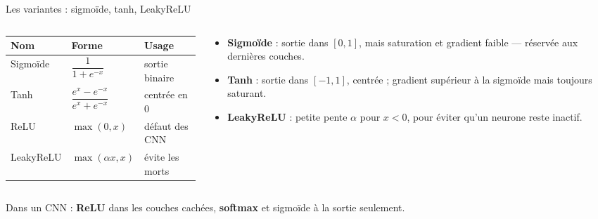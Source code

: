 \begin{frame}{Les variantes : sigmoïde, tanh, LeakyReLU}
\begin{columns}[t]
\begin{column}{0.52\textwidth}
\begin{center}
\begin{tabular}{@{}lll@{}}
\toprule
\textbf{Nom} & \textbf{Forme} & \textbf{Usage} \\
\midrule
Sigmoïde & $\dfrac{1}{1+e^{-x}}$ & sortie binaire \\
Tanh & $\dfrac{e^{x}-e^{-x}}{e^{x}+e^{-x}}$ & centrée en $0$ \\
ReLU & $\max(0,x)$ & défaut des CNN \\
LeakyReLU & $\max(\alpha x,x)$ & évite les morts \\
\bottomrule
\end{tabular}
\end{center}
\end{column}
\begin{column}{0.44\textwidth}
\begin{itemize}
  \item \textbf{Sigmoïde} : sortie dans $[0,1]$, mais saturation et gradient
  faible --- réservée aux dernières couches.
  \item \textbf{Tanh} : sortie dans $[-1,1]$, centrée ; gradient supérieur à
  la sigmoïde mais toujours saturant.
  \item \textbf{LeakyReLU} : petite pente $\alpha$ pour $x<0$, pour éviter
  qu'un neurone reste inactif.
\end{itemize}
\end{column}
\end{columns}
\vspace{1mm}
\begin{kbox}
Dans un CNN : \textbf{ReLU} dans les couches cachées, \textbf{softmax} et
sigmoïde à la sortie seulement.
\end{kbox}
\end{frame}

